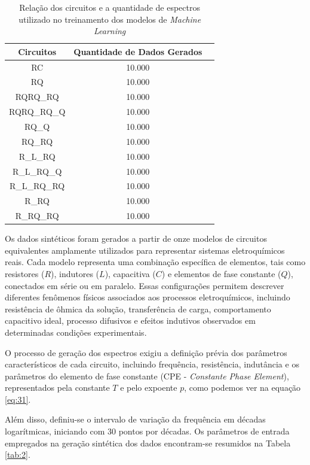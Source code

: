 \begin{table}[htb]
    \centering
    \caption{Relação dos circuitos e a quantidade de espectros utilizado no treinamento dos modelos de \textit{Machine Learning}}
    \label{tab:1}
    \begin{tabular}{ccc}
        \hline
        Circuitos & Quantidade de Dados Gerados \\
        \hline
        RC & 10.000 \\         
        RQ & 10.000 \\
        RQRQ\_RQ & 10.000 \\
        RQRQ\_RQ\_Q & 10.000 \\
        RQ\_Q & 10.000 \\
        RQ\_RQ & 10.000 \\
        R\_L\_RQ & 10.000 \\
        R\_L\_RQ\_Q & 10.000 \\
        R\_L\_RQ\_RQ & 10.000 \\
        R\_RQ & 10.000 \\
        R\_RQ\_RQ & 10.000 \\   
        \hline
    \end{tabular}
\end{table}

Os dados sintéticos foram gerados a partir de onze modelos de circuitos
equivalentes amplamente utilizados para representar sistemas eletroquímicos reais. Cada
modelo representa uma combinação específica de elementos, tais como resistores ($R$),
indutores ($L$), capacitiva ($C$) e elementos de fase constante ($Q$), conectados em série ou em
paralelo. Essas configurações permitem descrever diferentes fenômenos físicos associados aos
processos eletroquímicos, incluindo resistência de ôhmica da solução, transferência de carga,
comportamento capacitivo ideal, processo difusivos e efeitos indutivos observados em
determinadas condições experimentais.

O processo de geração dos espectros exigiu a definição
prévia dos parâmetros característicos de cada circuito, incluindo frequência, resistência,
indutância e os parâmetros do elemento de fase constante (CPE - \textit{Constante Phase Element}), representados pela constante $T$ e pelo expoente $p$, como podemos
ver na equação \eqref{eq:31}. 

Além disso, definiu-se o intervalo de variação da frequência em décadas
logarítmicas, iniciando com 30 pontos por décadas. Os parâmetros de entrada empregados na geração
sintética dos dados encontram-se resumidos na Tabela \ref{tab:2}.

